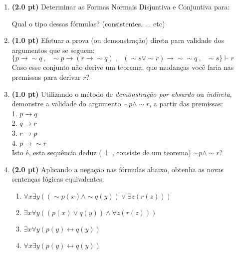 \documentclass[10pt, a4paper,final]{article}
\begin{document}
\begin{enumerate}

\item {\bf (2.0 pt)} Determinar as Formas Normais Disjuntiva e Conjuntiva para:
Qual o tipo dessas fórmulas? (consistentes, ... etc)

\item {\bf (1.0 pt)} Efetuar a prova (ou demonstração) direta para validade dos argumentos
que se seguem: \\

 $\{p\rightarrow \sim q \: , \:\:\: \sim p \rightarrow (r \rightarrow \sim q)  \: , \:\:\:
 (\sim s \vee \sim r)\rightarrow \sim \sim q  \: , \:\:\: \sim s  \} \vdash  r $ \\
 
Caso esse conjunto não derive um teorema, que mudanças
você faria nas premissas para derivar $r$?

\item {\bf (1.0 pt)} Utilizando o método de  {\em demonstração por absurdo} ou {\em indireta},
 demonstre a validade do   argumento $ \sim p \wedge \sim r $, a partir 
 das premissas: \\
1. $  p \rightarrow  q $ \\
2. $ q \rightarrow r $ \\
3. $ r \rightarrow p $ \\
4. $ p \rightarrow \sim r $ \\
Isto é, esta sequência deduz ( $\vdash $, consiste
de um teorema) $ \sim p \wedge \sim r$?

\item {\bf (2.0 pt)} Aplicando a negação nas fórmulas abaixo, obtenha
 as novas  sentenças lógicas equivalentes:
\begin{enumerate}
\setlength{\itemsep}{-2pt}
 \item $ \forall x \exists y ((\sim p(x) \wedge \sim q(y)) \vee \exists z (r(z)))$
 \item $ \exists x \forall y ((p(x) \vee q(y)) \wedge \forall z (r(z)))$
  \item  $ \exists x \forall y (p(y) \leftrightarrow q(y))$
  \item  $ \forall x \exists y (p(y) \leftrightarrow q(y))$
\end{enumerate}



\end{enumerate}
\end{document}

